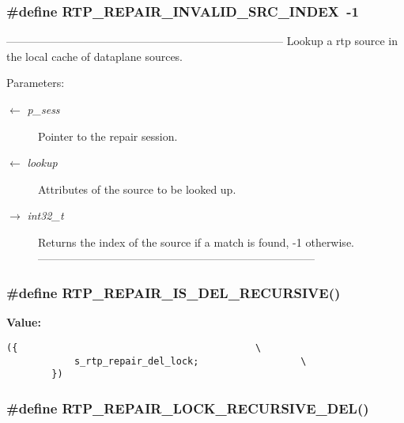 \subsubsection{\setlength{\rightskip}{0pt plus 5cm}\#define RTP\_\-REPAIR\_\-INVALID\_\-SRC\_\-INDEX~-1}\label{rtp__repair__recv_8c_a57950193284005b63361d48ef38b909}


--------------------------------------------------------------------------- Lookup a rtp source in the local cache of dataplane sources.

\begin{Desc}
\item[Parameters:]
\begin{description}
\item[\mbox{$\leftarrow$} {\em p\_\-sess}]Pointer to the repair session. \item[\mbox{$\leftarrow$} {\em lookup}]Attributes of the source to be looked up. \item[\mbox{$\rightarrow$} {\em int32\_\-t}]Returns the index of the source if a match is found, -1 otherwise. --------------------------------------------------------------------------- \end{description}
\end{Desc}
\subsubsection{\setlength{\rightskip}{0pt plus 5cm}\#define RTP\_\-REPAIR\_\-IS\_\-DEL\_\-RECURSIVE()}\label{rtp__repair__recv_8c_9986a7e94e7919415256bb6cb1755ce4}


\textbf{Value:}

\begin{Code}\begin{verbatim}({                                          \
            s_rtp_repair_del_lock;                  \
        })
\end{verbatim}\end{Code}
\subsubsection{\setlength{\rightskip}{0pt plus 5cm}\#define RTP\_\-REPAIR\_\-LOCK\_\-RECURSIVE\_\-DEL()}\label{rtp__repair__recv_8c_b2963c8dc048defbf7c4fad42709ff6c}


